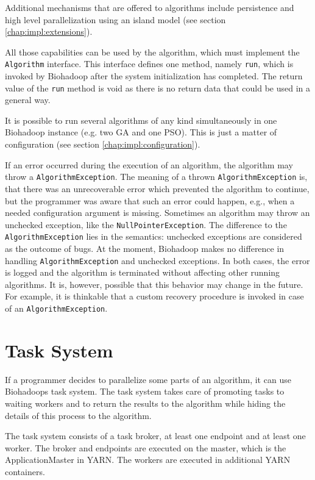 Additional mechanisms that are offered to algorithms include persistence and high level parallelization using an island model (see section \ref{chap:impl:extensions}).

All those capabilities can be used by the algorithm, which must implement the \texttt{Algorithm} interface. This interface defines one method, namely \texttt{run}, which is invoked by Biohadoop after the system initialization has completed. The return value of the \texttt{run} method is void as there is no return data that could be used in a general way.

It is possible to run several algorithms of any kind simultaneously in one Biohadoop instance (e.g. two GA and one PSO). This is just a matter of configuration (see section \ref{chap:impl:configuration}).
   
If an error occurred during the execution of an algorithm, the algorithm may throw a \texttt{AlgorithmException}. The meaning of a thrown \texttt{AlgorithmException} is, that there was an unrecoverable error which prevented the algorithm to continue, but the programmer was aware that such an error could happen, e.g., when a needed configuration argument is missing. Sometimes an algorithm may throw an unchecked exception, like the \texttt{NullPointerException}. The difference to the \texttt{AlgorithmException} lies in the semantics: unchecked exceptions are considered as the outcome of bugs. At the moment, Biohadoop makes no difference in handling \texttt{AlgorithmException} and unchecked exceptions. In both cases, the error is logged and the algorithm is terminated without affecting other running algorithms. It is, however, possible that this behavior may change in the future. For example, it is thinkable that a custom recovery procedure is invoked in case of an \texttt{AlgorithmException}.

\section{Task System}
\label{chap:impl:task-system}
If a programmer decides to parallelize some parts of an algorithm, it can use Biohadoops task system. The task system takes care of promoting tasks to waiting workers and to return the results to the algorithm while hiding the details of this process to the algorithm.

The task system consists of a task broker, at least one endpoint and at least one worker. The broker and endpoints are executed on the master, which is the ApplicationMaster in YARN. The workers are executed in additional YARN containers.

